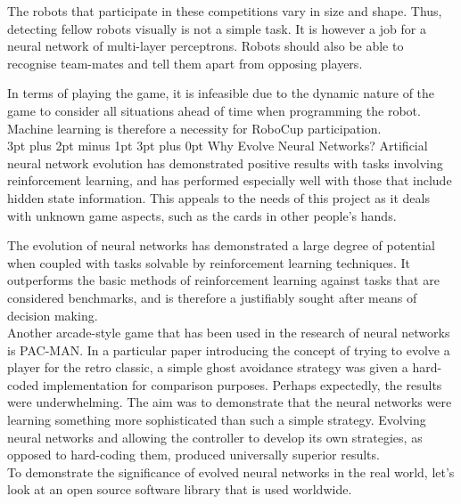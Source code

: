 \documentclass[12pt,a4paper]{article}
\makeatletter
\renewcommand\subsection{\@startsection {subsection}{1}{2mm} %
                               {3pt plus 2pt minus 1pt} %
                               {3pt plus 0pt} %
                               {\normalfont\bfseries}}
\makeatother
\begin{document}
The robots that participate in these competitions vary in size and shape. Thus, detecting fellow robots visually is not a simple task. It is however a job for a neural network of multi-layer perceptrons\citep{24}. Robots should also be able to recognise team-mates and tell them apart from opposing players. 

In terms of playing the game, it is infeasible due to the dynamic nature of the game to consider all situations ahead of time when programming the robot\cite{25}. Machine learning is therefore a necessity for RoboCup participation.\\


\subsection{Why Evolve Neural Networks?}
Artificial neural network evolution has demonstrated positive results with tasks involving reinforcement learning, and has performed especially well with those that include hidden state information\citep{EfficientEvolutionOfNeuralNetworkTopologies}. This appeals to the needs of this project as it deals with unknown game aspects, such as the cards in other people's hands. 

The evolution of neural networks has demonstrated a large degree of potential when coupled with tasks solvable by reinforcement learning techniques\citep{EfficientEvolutionOfNeuralNetworkTopologies}. It outperforms the basic methods of reinforcement learning against tasks that are considered benchmarks, and is therefore a justifiably sought after means of decision making.\\

Another arcade-style game that has been used in the research of neural networks is PAC-MAN. In a particular paper introducing the concept of trying to evolve a player for the retro classic, a simple ghost avoidance strategy was given a hard-coded implementation for comparison purposes. Perhaps expectedly, the results were underwhelming. The aim was to demonstrate that the neural networks were learning something more sophisticated than such a simple strategy\citep{MSPacMan}. Evolving neural networks and allowing the controller to develop its own strategies, as opposed to hard-coding them, produced universally superior results.\\

To demonstrate the significance of evolved neural networks in the real world, let's look at an open source software library that is used worldwide. 
\end{document}
